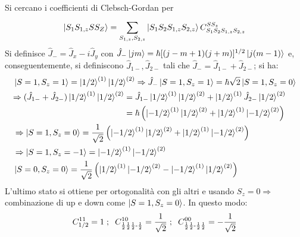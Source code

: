 \documentclass[10pt, a4paper]{scrartcl} %
\numberwithin{equation}{subsection}
\theoremstyle{style2}
\theoremstyle{style1}
\begin{document}
Si cercano i coefficienti di Clebsch-Gordan per 
\[
\ket{S_1S_{1,z} S S_Z } = \sum_{S_{1,z} , S_{2,z}}^{} \ket{S_1S_2 S_{1,z} S_{2,z} } C^{SS_z} _{S_1S_2S_{1,z} S_{2,z} } 
\] 
Si definisce $\hat{J}_- = \hat{J}_x - i \hat{J}_y$ con $\hat{J}_- \ket{jm} = \hbar [(j-m+1)(j+m)]^{1 / 2}\ket{j (m-1)}  $ e, conseguentemente, si definiscono $\hat{J}_{1-} , \hat{J}_{2-} $ tali che $\hat{J}_- = \hat{J}_{1-} + \hat{J}_{2-} $; si ha:
\begin{equation}
\begin{split}
	& \ket{S=1 , S_z = 1} = \ket{1 / 2} ^{(1)} \ket{1 / 2} ^{(2)} \Rightarrow \hat{J}_- \ket{S=1, S_z = 1} = \hbar  \sqrt{2}  \ket{S=1, S_z = 0} \\
	& \begin{split}
		\Rightarrow(\hat{J}_{1-} + \hat{J}_{2-} ) \ket{1 / 2} ^{(1)} \ket{1 / 2} ^{(2)} &= \hat{J}_{1-} \ket{1 / 2} ^{(1)} \ket{1 / 2} ^{(2)} + \ket{1 / 2} ^{(1)}\hat{J}_{2-}  \ket{1 / 2} ^{(2)}\\
										     & = \hbar \left(\ket{-1 / 2}^{(1)} \ket{1 / 2} ^{(2)} + \ket{ 1/2}^{(1)} \ket{-1 / 2} ^{(2)}   \right) 
	\end{split}\\
	&\Rightarrow \ket{S=1, S_z = 0} = \frac{1}{\sqrt{2} } \left(\ket{-1 / 2}^{(1)} \ket{1 / 2} ^{(2)} + \ket{ 1/2}^{(1)} \ket{-1 / 2} ^{(2)}   \right) \\
	&\Rightarrow \ket{S=1, S_z = -1} = \ket{- 1/2} ^{(1)} \ket{- 1 / 2} ^{(2)} \\
	&\ket{S=0, S_z=0} = \frac{1}{\sqrt{2} } \left(\ket{1 / 2} ^{(1)} \ket{- 1 / 2} ^{(2)} - \ket{-1 / 2} ^{(1)} \ket{1 / 2} ^{(2)} \right) 
\end{split}	
\end{equation}
L'ultimo stato si ottiene per ortogonalit\`a con gli altri e usando $S_z = 0\Rightarrow $ combinazione di up e down come $\ket{S=1,S_z = 0} $. In questo modo:
\begin{equation}
	C^{11} _{1 / 2} = 1 \hspace{.1cm} ; \hspace{.2cm} C^{10} _{\frac{1}{2} \frac{1}{2}\frac{1}{2} \text{-}\frac{1}{2}} = \frac{1}{\sqrt{2} }\hspace{.1cm} ; \hspace{.2cm} C^{00} _{\frac{1}{2} \frac{1}{2}\text{-}\frac{1}{2}\frac{1}{2}} = - \frac{1}{\sqrt{2} }
\end{equation}
\end{document}
